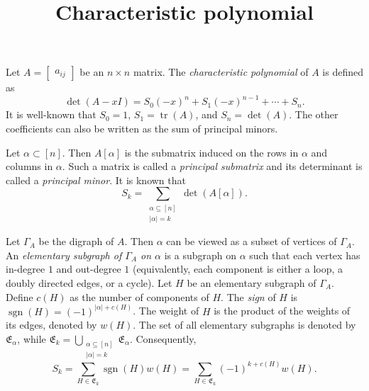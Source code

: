 \documentclass{article}
\title{Characteristic polynomial}
\date{\vspace{-1cm}}
\newcommand{\tr}{\operatorname{tr}}
\newcommand{\sgn}{\operatorname{sgn}}
\theoremstyle{definition}
\begin{document}
\maketitle
\large

Let $A = \begin{bmatrix} a_{ij} \end{bmatrix}$ be an $n\times n$ matrix.  The \emph{characteristic polynomial} of $A$ is defined as 
\[\det(A - xI) = S_0(-x)^n + S_1(-x)^{n-1} + \cdots + S_n.\]
It is well-known that $S_0 = 1$, $S_1 = \tr(A)$, and $S_n = \det(A)$.  The other coefficients can also be written as the sum of principal minors.

Let $\alpha\subset[n]$.  Then $A[\alpha]$ is the submatrix induced on the rows in $\alpha$ and columns in $\alpha$.  Such a matrix is called a \emph{principal submatrix} and its determinant is called a \emph{principal minor}.  It is known that
\[S_k = \sum_{\substack{\alpha\subseteq [n]\\|\alpha| = k}} \det(A[\alpha]).\]

Let $\Gamma_A$ be the digraph of $A$.  Then $\alpha$ can be viewed as a subset of vertices of $\Gamma_A$.  An \emph{elementary subgraph of $\Gamma_A$ on $\alpha$} is a subgraph on $\alpha$ such that each vertex has in-degree $1$ and out-degree $1$ (equivalently, each component is either a loop, a doubly directed edges, or a cycle).  Let $H$ be an elementary subgraph of $\Gamma_A$.  Define $c(H)$ as the number of components of $H$.  The \emph{sign} of $H$ is $\sgn(H) = (-1)^{|\alpha|+c(H)}$.  The weight of $H$ is the product of the weights of its edges, denoted by $w(H)$.  
The set of all elementary subgraphs is denoted by $\mathfrak{E}_\alpha$, while $\mathfrak{E}_k = \bigcup_{\substack{\alpha\subseteq [n]\\|\alpha| = k}}\mathfrak{E}_\alpha$.  
Consequently, 
\[S_k = \sum_{H\in\mathfrak{E}_k} \sgn(H)w(H) = \sum_{H\in\mathfrak{E}_k}(-1)^{k+c(H)}w(H).\]
\end{document}
